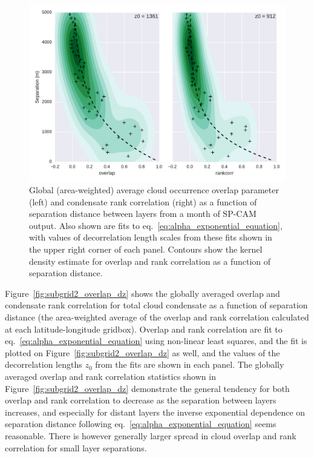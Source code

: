\begin{figure}[htbp]
\centering
\includegraphics{graphics/subgrid2_overlap_dz.pdf}
\caption{\label{fig:subgrid2_overlap_dz}Global (area-weighted) average
cloud occurrence overlap parameter (left) and condensate rank
correlation (right) as a function of separation distance between layers
from a month of SP-CAM output. Also shown are fits to
eq.~\ref{eq:alpha_exponential_equation}, with values of decorrelation
length scales from these fits shown in the upper right corner of each
panel. Contours show the kernel density estimate for overlap and rank
correlation as a function of separation
distance.}\label{fig:subgrid2ux5foverlapux5fdz}
\end{figure}

Figure~\ref{fig:subgrid2_overlap_dz} shows the globally averaged overlap
and condensate rank correlation for total cloud condensate as a function
of separation distance (the area-weighted average of the overlap and
rank correlation calculated at each latitude-longitude gridbox). Overlap
and rank correlation are fit to eq.~\ref{eq:alpha_exponential_equation}
using non-linear least squares, and the fit is plotted on
Figure~\ref{fig:subgrid2_overlap_dz} as well, and the values of the
decorrelation lengths \(z_0\) from the fits are shown in each panel. The
globally averaged overlap and rank correlation statistics shown in
Figure~\ref{fig:subgrid2_overlap_dz} demonstrate the general tendency
for both overlap and rank correlation to decrease as the separation
between layers increases, and especially for distant layers the inverse
exponential dependence on separation distance following
eq.~\ref{eq:alpha_exponential_equation} seems reasonable. There is
however generally larger spread in cloud overlap and rank correlation
for small layer separations.

